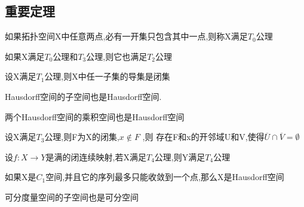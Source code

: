 \subsection*{重要定理}
\begin{definition}
    如果拓扑空间X中任意两点,必有一开集只包含其中一点,则称X满足\(T_0\)公理
\end{definition}
\begin{theorem}
    如果X满足\(T_0\)公理和\(T_3\)公理,则它也满足\(T_2\)公理
\end{theorem}
\begin{theorem}
    设X满足\(T_1\)公理,则X中任一子集的导集是闭集
\end{theorem}
\begin{theorem}
    Hausdorff空间的子空间也是Hausdorff空间.
\end{theorem}
\begin{theorem}
    两个Hausdorff空间的乘积空间也是Hausdorff空间
\end{theorem}
\begin{theorem}
    设X满足\(T_3\)公理,则F为X的闭集,\(x \notin F\) ,则 存在F和x的开邻域U和V,使得\(\overline{U}\cap \overline{V} = \emptyset \)
\end{theorem}
\begin{theorem}
    设\(f: X \rightarrow Y \)是满的闭连续映射,若X满足\(T_4\)公理,则Y满足\(T_4\)公理
\end{theorem}
\begin{theorem}
    如果X是\(C_1\)空间,并且它的序列最多只能收敛到一个点,那么X是Hausdorff空间
\end{theorem}
\begin{theorem}
    可分度量空间的子空间也是可分空间
\end{theorem}
